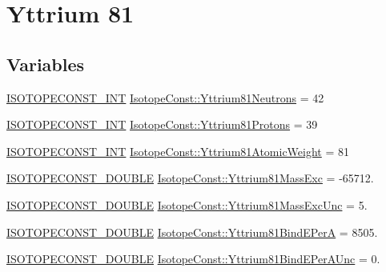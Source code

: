 \hypertarget{group___isotope_const-_yttrium-_y81}{}\section{Yttrium 81}
\label{group___isotope_const-_yttrium-_y81}
\subsection*{Variables}
\begin{DoxyCompactItemize}
\item 
\mbox{\hyperlink{group___isotope_const-_macros_ga5f18360b3e99483a35c32d789e62621c}{I\+S\+O\+T\+O\+P\+E\+C\+O\+N\+S\+T\+\_\+\+I\+NT}} \mbox{\hyperlink{group___isotope_const-_yttrium-_y81_ga60ad73a045fb95474f4a5dfc1db16462}{Isotope\+Const\+::\+Yttrium81\+Neutrons}} = 42
\item 
\mbox{\hyperlink{group___isotope_const-_macros_ga5f18360b3e99483a35c32d789e62621c}{I\+S\+O\+T\+O\+P\+E\+C\+O\+N\+S\+T\+\_\+\+I\+NT}} \mbox{\hyperlink{group___isotope_const-_yttrium-_y81_ga56c57a673c04e38ff92664d2da4c6059}{Isotope\+Const\+::\+Yttrium81\+Protons}} = 39
\item 
\mbox{\hyperlink{group___isotope_const-_macros_ga5f18360b3e99483a35c32d789e62621c}{I\+S\+O\+T\+O\+P\+E\+C\+O\+N\+S\+T\+\_\+\+I\+NT}} \mbox{\hyperlink{group___isotope_const-_yttrium-_y81_gad26850497309ba3ec1d5e2fddafa6327}{Isotope\+Const\+::\+Yttrium81\+Atomic\+Weight}} = 81
\item 
\mbox{\hyperlink{group___isotope_const-_macros_ga8f45a7272ce02c0b4c65c44636ed719a}{I\+S\+O\+T\+O\+P\+E\+C\+O\+N\+S\+T\+\_\+\+D\+O\+U\+B\+LE}} \mbox{\hyperlink{group___isotope_const-_yttrium-_y81_ga1ddf6ce0c55eba3ff4eb078a4b41f2e5}{Isotope\+Const\+::\+Yttrium81\+Mass\+Exc}} = -\/65712.
\item 
\mbox{\hyperlink{group___isotope_const-_macros_ga8f45a7272ce02c0b4c65c44636ed719a}{I\+S\+O\+T\+O\+P\+E\+C\+O\+N\+S\+T\+\_\+\+D\+O\+U\+B\+LE}} \mbox{\hyperlink{group___isotope_const-_yttrium-_y81_gaa15705491ab96c79f2359a273704cda5}{Isotope\+Const\+::\+Yttrium81\+Mass\+Exc\+Unc}} = 5.
\item 
\mbox{\hyperlink{group___isotope_const-_macros_ga8f45a7272ce02c0b4c65c44636ed719a}{I\+S\+O\+T\+O\+P\+E\+C\+O\+N\+S\+T\+\_\+\+D\+O\+U\+B\+LE}} \mbox{\hyperlink{group___isotope_const-_yttrium-_y81_ga3a05eb166e362c18b9ad5e90a67af8c7}{Isotope\+Const\+::\+Yttrium81\+Bind\+E\+PerA}} = 8505.
\item 
\mbox{\hyperlink{group___isotope_const-_macros_ga8f45a7272ce02c0b4c65c44636ed719a}{I\+S\+O\+T\+O\+P\+E\+C\+O\+N\+S\+T\+\_\+\+D\+O\+U\+B\+LE}} \mbox{\hyperlink{group___isotope_const-_yttrium-_y81_ga32a0926ac71764a1a3bd128ff3143d80}{Isotope\+Const\+::\+Yttrium81\+Bind\+E\+Per\+A\+Unc}} = 0.

\end{DoxyCompactItemize}
